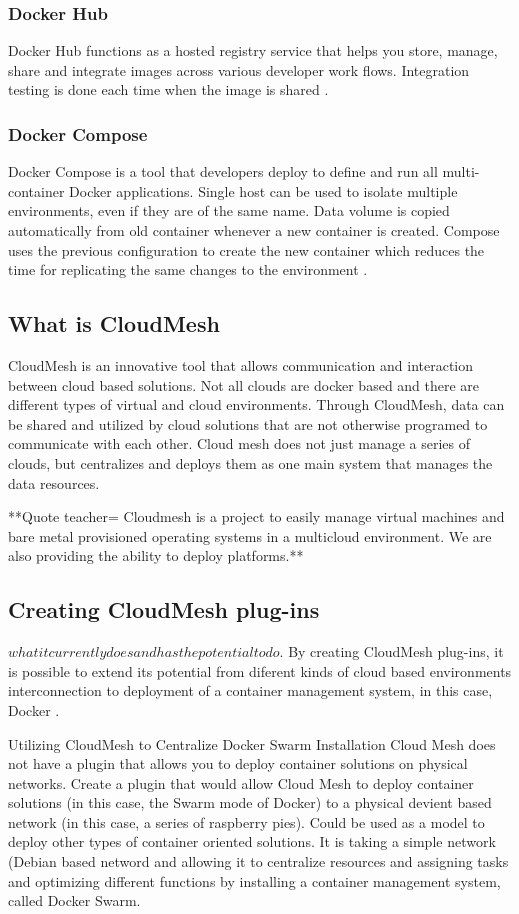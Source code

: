 \documentclass[sigconf]{acmart}
\begin{document}
	\subsubsection{Docker Hub}
	Docker Hub functions as a hosted registry service that helps you store, manage, share and integrate images across various developer work flows. Integration testing is done each time when the image is shared \cite{hackernoon}.
	\subsubsection{Docker Compose}
	Docker Compose is a tool that developers deploy to define and run all multi-container Docker applications. Single host can be used to isolate
	multiple environments, even if they are of the same name. Data volume is copied automatically from old container whenever a new container is created. Compose uses the previous configuration to create the new container which reduces the time for replicating the same changes to the environment \cite{hackernoon}.
	
	
	\subsection{What is CloudMesh}
	CloudMesh is an innovative tool that allows communication and interaction between cloud based solutions.  Not all clouds are docker based and there are different types of virtual and cloud environments. Through CloudMesh, data can be shared and utilized by cloud solutions that are not otherwise programed to communicate with each other.  Cloud mesh does not just manage a series of clouds, but centralizes and deploys them as one main system that manages the data resources.
	
	**Quote teacher=
	Cloudmesh is a project to easily manage virtual machines and bare metal provisioned operating systems in a multicloud environment. We are also providing the ability to deploy platforms.**
	
	\subsection{Creating CloudMesh plug-ins}
	$what it currently does and has the potential to do$.  
	By creating CloudMesh plug-ins, it is possible to  extend its potential from diferent kinds of cloud based environments interconnection to deployment of a container management system, in this case, Docker .  
	
	Utilizing CloudMesh to Centralize Docker Swarm Installation Cloud Mesh does not have a plugin that allows you to deploy container solutions on physical networks.  Create a plugin that would allow Cloud Mesh to deploy container solutions (in this case, the Swarm mode of Docker) to a physical devient based network (in this case, a series of raspberry pies).  Could be used as a model to deploy other types of container oriented solutions.  It is taking a simple network (Debian based netword and allowing it to centralize resources and assigning tasks and optimizing different functions by installing a container management system, called Docker Swarm.
	
\end{document}
